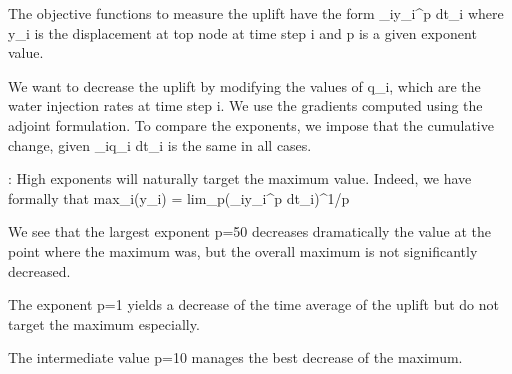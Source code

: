 The objective functions to measure the uplift have the form
          \Sigma_iy_i^p dt_i
where y_i is the displacement at top node at time step i and p is a given exponent value.

We want to decrease the uplift by modifying the values of q_i, which are the water injection rates at time step i. We use the gradients computed using the adjoint formulation. To compare the exponents, we impose that the cumulative change, given \Sigma_i\delta q_i dt_{i} is the same in all cases.  

{\bfObservations:} High exponents will naturally target the maximum value. Indeed, we have formally that
          max_i(y_i) = lim_{p\rightarrow\infty}(\Sigma_{i}y_{i}^{p} dt_i)^{1/p}

\bullet We see that the largest exponent p=50 decreases dramatically the value at the point where the maximum was, but the overall maximum is not significantly decreased. 

\bullet The exponent p=1 yields a decrease of the time average of the uplift but do not target the maximum especially. 

\bullet The intermediate value p=10 manages the best decrease of the maximum.
